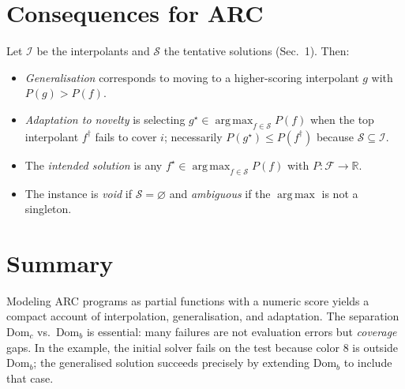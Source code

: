 \documentclass[11pt]{article}
\newcommand{\F}{\mathcal{F}}
\newcommand{\Domc}{\mathrm{Dom}_c}
\newcommand{\Domb}{\mathrm{Dom}_b}
\DeclareMathOperator*{\argmax}{arg\,max}
\begin{document}
\section{Consequences for ARC}

Let $\mathcal{I}$ be the interpolants and $\mathcal{S}$ the tentative solutions (Sec.~1). Then:
\begin{itemize}[leftmargin=1.5em]
\item \emph{Generalisation} corresponds to moving to a higher-scoring interpolant $g$ with $P(g)>P(f)$.
\item \emph{Adaptation to novelty} is selecting $g^\star\in\argmax_{f\in\mathcal{S}}P(f)$ when the top interpolant $f^\dagger$ fails to cover $i$; necessarily $P(g^\star)\le P(f^\dagger)$ because $\mathcal{S}\subseteq\mathcal{I}$.
\item The \emph{intended solution} is any $f^\star\in\argmax_{f\in\mathcal{S}}P(f)$ with $P:\F\to\mathbb{R}$.
\item The instance is \emph{void} if $\mathcal{S}=\varnothing$ and \emph{ambiguous} if the $\argmax$ is not a singleton.
\end{itemize}

\section{Summary}

Modeling ARC programs as partial functions with a numeric score yields a compact account of interpolation, generalisation, and adaptation. The separation $\Domc$ vs.\ $\Domb$ is essential: many failures are not evaluation errors but \emph{coverage} gaps. In the example, the initial solver fails on the test because color $8$ is outside $\Domb$; the generalised solution succeeds precisely by extending $\Domb$ to include that case.
\end{document}
